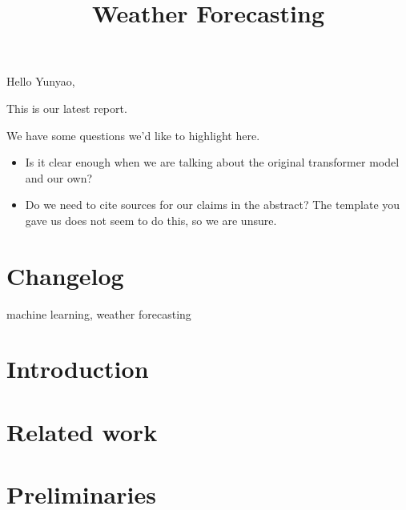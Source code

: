 


Hello Yunyao,

This is our latest report.

We have some questions we'd like to highlight here.

\begin{itemize}
    \item Is it clear enough when we are talking about the original transformer model and our own? 
    \item Do we need to cite sources for our claims in the abstract? The template you gave us does not seem to do this, so we are unsure.
\end{itemize}

\section{Changelog}


\newpage

\title{Weather Forecasting}
\author{
    \and
    \and
    \and
}

\maketitle

\begin{abstract}

\end{abstract}

\begin{IEEEkeywords}
machine learning, weather forecasting
\end{IEEEkeywords}

\section{Introduction}


\section{Related work}\label{sec:relatedwork}




\section{Preliminaries}



